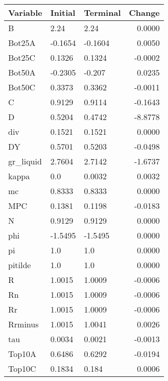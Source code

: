 \begin{table}
\centering
\label{tab:stst_comparison_low_B_wedge_permanent}
\begin{tabular}{lllr}
\toprule
                Variable & Initial & Terminal &  Change \\
\midrule
                       B &    2.24 &     2.24 &  0.0000 \\
                  Bot25A & -0.1654 &  -0.1604 &  0.0050 \\
                  Bot25C &  0.1326 &   0.1324 & -0.0002 \\
                  Bot50A & -0.2305 &   -0.207 &  0.0235 \\
                  Bot50C &  0.3373 &   0.3362 & -0.0011 \\
                       C &  0.9129 &   0.9114 & -0.1643 \\
                       D &  0.5204 &   0.4742 & -8.8778 \\
                     div &  0.1521 &   0.1521 &  0.0000 \\
                      DY &  0.5701 &   0.5203 & -0.0498 \\
               gr\_liquid &  2.7604 &   2.7142 & -1.6737 \\
                   kappa &     0.0 &   0.0032 &  0.0032 \\
                      mc &  0.8333 &   0.8333 &  0.0000 \\
                     MPC &  0.1381 &   0.1198 & -0.0183 \\
                       N &  0.9129 &   0.9129 &  0.0000 \\
                     phi & -1.5495 &  -1.5495 &  0.0000 \\
                      pi &     1.0 &      1.0 &  0.0000 \\
                 pitilde &     1.0 &      1.0 &  0.0000 \\
                       R &  1.0015 &   1.0009 & -0.0006 \\
                      Rn &  1.0015 &   1.0009 & -0.0006 \\
                      Rr &  1.0015 &   1.0009 & -0.0006 \\
                 Rrminus &  1.0015 &   1.0041 &  0.0026 \\
                     tau &  0.0034 &   0.0021 & -0.0013 \\
                  Top10A &  0.6486 &   0.6292 & -0.0194 \\
                  Top10C &  0.1834 &    0.184 &  0.0006 \\

\end{tabular}
\end{table}
